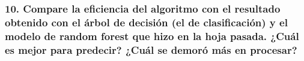 \documentclass[
]{article}
\begin{document}
\hypertarget{compare-la-eficiencia-del-algoritmo-con-el-resultado-obtenido-con-el-uxe1rbol-de-decisiuxf3n-el-de-clasificaciuxf3n-y-el-modelo-de-random-forest-que-hizo-en-la-hoja-pasada.-cuuxe1l-es-mejor-para-predecir-cuuxe1l-se-demoruxf3-muxe1s-en-procesar}{%
\subsubsection{10. Compare la eficiencia del algoritmo con el resultado
obtenido con el árbol de decisión (el de clasificación) y el modelo de
random forest que hizo en la hoja pasada. ¿Cuál es mejor para predecir?
¿Cuál se demoró más en
procesar?}\label{compare-la-eficiencia-del-algoritmo-con-el-resultado-obtenido-con-el-uxe1rbol-de-decisiuxf3n-el-de-clasificaciuxf3n-y-el-modelo-de-random-forest-que-hizo-en-la-hoja-pasada.-cuuxe1l-es-mejor-para-predecir-cuuxe1l-se-demoruxf3-muxe1s-en-procesar}}
\end{document}
